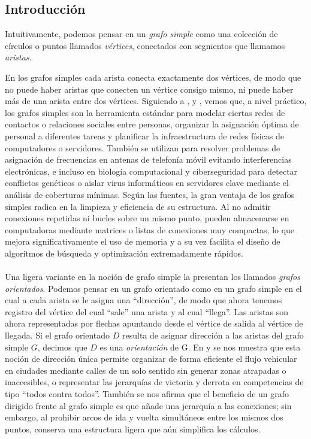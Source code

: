 \subsection{Introducción}
Intuitivamente, podemos pensar en un \textit{grafo simple} como una colección de círculos o puntos llamados \textit{vértices}, conectados con segmentos que llamamos \textit{aristas}.

En los grafos simples cada arista conecta exactamente dos vértices, de modo que no puede haber aristas que conecten un vértice consigo mismo, ni puede haber más de una arista entre dos vértices. Siguiendo a \cite{Foulds1991}, \cite{Gross2006} y \cite{Pirzada2007}, vemos que, a nivel práctico, los grafos simples son la herramienta estándar para modelar ciertas redes de contactos o relaciones sociales entre personas, organizar la asignación óptima de personal a diferentes tareas y planificar la infraestructura de redes físicas de computadores o servidores. También se utilizan para resolver problemas de asignación de frecuencias en antenas de telefonía móvil evitando interferencias electrónicas, e incluso en biología computacional y ciberseguridad para detectar conflictos genéticos o aislar virus informáticos en servidores clave mediante el análisis de coberturas mínimas. Según las fuentes, la gran ventaja de los grafos simples radica en la limpieza y eficiencia de su estructura. Al no admitir conexiones repetidas ni bucles sobre un mismo punto, pueden almacenarse en computadoras mediante matrices o listas de conexiones muy compactas, lo que mejora significativamente el uso de memoria y a su vez facilita el diseño de algoritmos de búsqueda y optimización extremadamente rápidos.\\\\
Una ligera variante en la noción de grafo simple la presentan los llamados \textit{grafos orientados}. Podemos pensar en un grafo orientado como en un grafo simple en el cual a cada arista se le asigna una ``dirección'', de modo que ahora tenemos registro del vértice del cual ``sale'' una arista y al cual ``llega''. Las aristas son ahora representadas por flechas apuntando desde el vértice de salida al vértice de llegada. Si el grafo orientado $D$ resulta de asignar dirección a las aristas del grafo simple $G$, decimos que $D$ es una \textit{orientación} de G.
\clearpage
En \cite{Foulds1991} y \cite{Roberts1978} se nos muestra que esta noción de dirección única permite organizar de forma eficiente el flujo vehicular en ciudades mediante calles de un solo sentido sin generar zonas atrapadas o inaccesibles, o representar las jerarquías de victoria y derrota en competencias de tipo ``todos contra todos''. También se nos afirma que el beneficio de un grafo dirigido frente al grafo simple es que añade una jerarquía a las conexiones; sin embargo, al prohibir arcos de ida y vuelta simultáneos entre los mismos dos puntos, conserva una estructura ligera que aún simplifica los cálculos.\\\\
